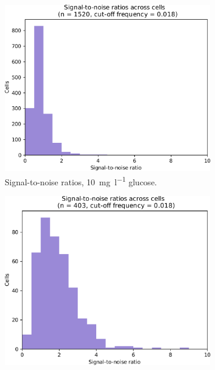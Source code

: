 \begin{figure}
  \centering
  \begin{subfigure}[t]{0.3\textwidth}
   \centering
   \includegraphics[width=\textwidth]{limiting_snr_edit.pdf}
   \caption{
     Signal-to-noise ratios, \SI{10}{\milli\gram~\litre^{-1}} glucose.
   }
   \label{fig:biology-lowglc-snr}
  \end{subfigure}%
  \begin{subfigure}[t]{0.3\textwidth}
   \centering
   \includegraphics[width=\textwidth]{pyruvate_snr_edit.pdf}

\end{subfigure}
\end{figure}
